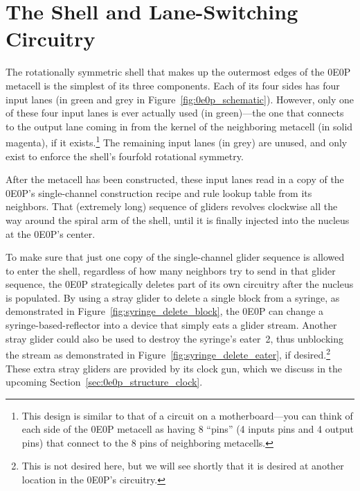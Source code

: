 \section{The Shell and Lane-Switching Circuitry}\label{sec:0e0p_structure_shell}

The rotationally symmetric shell that makes up the outermost edges of the 0E0P metacell is the simplest of its three components. Each of its four sides has four input lanes (in green and grey in Figure~\ref{fig:0e0p_schematic}). However, only one of these four input lanes is ever actually used (in green)---the one that connects to the output lane coming in from the kernel of the neighboring metacell (in solid magenta), if it exists.\footnote{This design is similar to that of a circuit on a motherboard---you can think of each side of the 0E0P metacell as having 8 ``pins'' (4 inputs pins and 4 output pins) that connect to the 8 pins of neighboring metacells.} The remaining input lanes (in grey) are unused, and only exist to enforce the shell's fourfold rotational symmetry.

After the metacell has been constructed, these input lanes read in a copy of the 0E0P's single-channel construction recipe and rule lookup table from its neighbors. That (extremely long) sequence of gliders revolves clockwise all the way around the spiral arm of the shell, until it is finally injected into the nucleus at the 0E0P's center.

To make sure that just one copy of the single-channel glider sequence is allowed to enter the shell, regardless of how many neighbors try to send in that glider sequence, the 0E0P strategically deletes part of its own circuitry after the nucleus is populated. By using a stray glider to delete a single block from a syringe, as demonstrated in Figure~\ref{fig:syringe_delete_block}, the 0E0P can change a syringe-based-reflector into a device that simply eats a glider stream. Another stray glider could also be used to destroy the syringe's eater~2, thus unblocking the stream as demonstrated in Figure~\ref{fig:syringe_delete_eater}, if desired.\footnote{This is not desired here, but we will see shortly that it is desired at another location in the 0E0P's circuitry.} These extra stray gliders are provided by its clock gun, which we discuss in the upcoming Section~\ref{sec:0e0p_structure_clock}.


